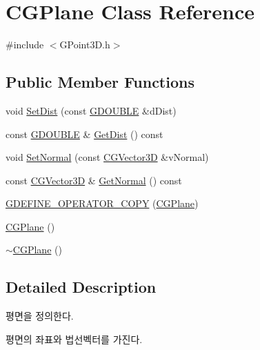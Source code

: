 \hypertarget{class_c_g_plane}{}\section{C\+G\+Plane Class Reference}
\label{class_c_g_plane}


{\ttfamily \#include $<$G\+Point3\+D.\+h$>$}

\subsection*{Public Member Functions}
\begin{DoxyCompactItemize}
\item 
void \hyperlink{class_c_g_plane_abbda647432f603bd51628e594337041a}{Set\+Dist} (const \hyperlink{_g_types_8h_afd05ac85f90ee8e2a733928545462cd4}{G\+D\+O\+U\+B\+L\+E} \&d\+Dist)
\item 
const \hyperlink{_g_types_8h_afd05ac85f90ee8e2a733928545462cd4}{G\+D\+O\+U\+B\+L\+E} \& \hyperlink{class_c_g_plane_a9f6317e07121cdb4f94659ef8bed2b8f}{Get\+Dist} () const 
\item 
void \hyperlink{class_c_g_plane_ada5180865c1bd883b069c20b649c8766}{Set\+Normal} (const \hyperlink{_g_point3_d_8h_aa7e73d39f4c991acb5a13c84b498366d}{C\+G\+Vector3\+D} \&v\+Normal)
\item 
const \hyperlink{_g_point3_d_8h_aa7e73d39f4c991acb5a13c84b498366d}{C\+G\+Vector3\+D} \& \hyperlink{class_c_g_plane_a07b067159fe022c59ccb1cb758eb93b2}{Get\+Normal} () const 
\item 
\hyperlink{class_c_g_plane_a643f4742cd6105c9da7b68feb15024fb}{G\+D\+E\+F\+I\+N\+E\+\_\+\+O\+P\+E\+R\+A\+T\+O\+R\+\_\+\+C\+O\+P\+Y} (\hyperlink{class_c_g_plane}{C\+G\+Plane})
\item 
\hyperlink{class_c_g_plane_a71afd78210974b5e6b3557e357c0f4e5}{C\+G\+Plane} ()
\item 
\hyperlink{class_c_g_plane_acf44ad823ef8391765bbbd62a2e92564}{$\sim$\+C\+G\+Plane} ()
\end{DoxyCompactItemize}


\subsection{Detailed Description}

\begin{DoxyItemize}
\item 평면을 정의한다.
\item 평면의 좌표와 법선벡터를 가진다. 
\end{DoxyItemize}

